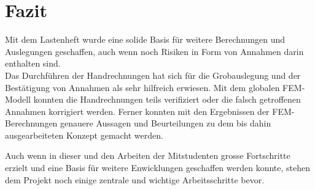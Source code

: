 \newpage

\section{Fazit}
Mit dem Lastenheft wurde eine solide Basis für weitere Berechnungen und Auslegungen geschaffen, auch wenn noch Risiken in Form von Annahmen darin enthalten sind.\\
Das Durchführen der Handrechnungen hat sich für die Grobauslegung und der Bestätigung von Annahmen als sehr hilfreich erwiesen. Mit dem globalen FEM-Modell konnten die Handrechnungen teils verifiziert oder die falsch getroffenen Annahmen korrigiert werden. Ferner konnten mit den Ergebnissen der FEM-Berechnungen genauere Aussagen und Beurteilungen zu dem bis dahin ausgearbeiteten Konzept gemacht werden.

Auch wenn in dieser und den Arbeiten der Mitstudenten grosse Fortschritte erzielt und eine Basis für weitere Enwicklungen geschaffen werden konnte, stehen dem Projekt noch einige zentrale und wichtige Arbeitsschritte bevor.
\newpage
